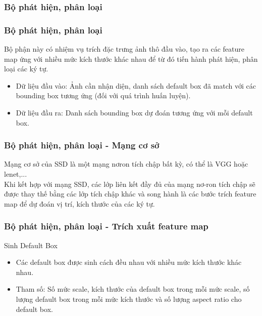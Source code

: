 \documentclass{beamer}
\begin{document}
	\subsubsection{Bộ phát hiện, phân loại}
	\begin{frame}
		\frametitle{Bộ phát hiện, phân loại}
		Bộ phận này có nhiệm vụ trích đặc trưng ảnh thô đầu vào, tạo ra các feature map ứng với nhiều mức kích thước khác nhau để từ đó tiến hành phát hiện, phân loại các ký tự.
		
		\begin{itemize}
			\item Dữ liệu đầu vào: Ảnh cần nhận diện, danh sách default box đã match với các bounding box tương ứng (đối với quá trình huấn luyện).
			\item Dữ liệu đầu ra: Danh sách bounding box dự đoán tương ứng với mỗi default box.
		\end{itemize}
		
		
		
		
		
	\end{frame}
	
	\begin{frame}
		\frametitle{Bộ phát hiện, phân loại - Mạng cơ sở}
		Mạng cơ sở của SSD là một mạng nơron tích chập bất kỳ, có thể là VGG\cite{Simonyan14c} hoặc lenet\cite{yanlecun},... \\
		Khi kết hợp với mạng SSD, các lớp liên kết đầy đủ của mạng nơ-ron tích chập sẽ được thay thế bằng các lớp tích chập khác và song hành là các bước trích feature map để dự đoán vị trí, kích thước của các ký tự.
		
	\end{frame}
	
	\begin{frame}
		\frametitle{Bộ phát hiện, phân loại - Trích xuất feature map}
		
		
		
		\begin{block}{Sinh Default Box}
			\begin{itemize}
				\item Các default box được sinh cách đều nhau với nhiều mức kích thước khác nhau.
				\item Tham số: Số mức scale, kích thước của default box trong mỗi mức scale, số lượng default box trong mỗi mức kích thước và số lượng aspect ratio cho default box.
			\end{itemize}
		\end{block}
		
	\end{frame}
	
\end{document}
